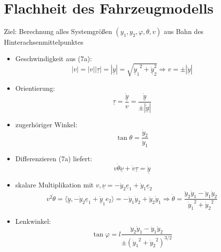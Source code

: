 \documentclass[ngerman]{tudscrreprt}
\begin{document}
\section*{Flachheit des Fahrzeugmodells}
Ziel: Berechnung alles Systemgrößen $(y_1, y_2, \varphi, \theta, v)$ aus Bahn des Hinterachsenmittelpunktes 
\begin{itemize}
\item Geschwindigkeit aus (7a): \\ 
\begin{equation*}
|v| = |v| |\underline \tau| = |\dot{\underline y}| = \sqrt{{\dot{\underline y}_1}^2 + {\dot{\underline y}}_2^2} \Rightarrow v = \pm |\dot{\underline y}|
\tag{8}
\end{equation*}
\item Orientierung: 
\begin{equation*}
\underline \tau = \frac{\dot{\underline y}}{v} = \frac{\dot{\underline y}}{\pm |\dot{\underline y}|}
\tag{9}
\end{equation*}
\item zugerhöriger Winkel:
\begin{equation*}
\tan{\theta} = \frac{\dot y_2}{\dot y_1}
\tag{10}
\end{equation*}

\item Differenzieren (7a) liefert: 
\begin{equation*}
v \dot{\theta}\underline \nu + \dot {v} \underline \tau = \ddot{\underline y}
\tag{11}
\end{equation*}
\item skalare Multiplikation mit $v, \underline \nu = - \dot{y}_2 \underline e_1 + \dot y_1 \underline e_2$ 
\begin{equation*}
v^2 \dot \theta = \langle \ddot{\underline y}, -\dot y_2 \underline e_1 + \underline{\dot{y}}_1 e_2 \rangle = -\ddot{y}_1 \dot{y}_2 + \ddot y_2 \dot y_1 \Rightarrow \dot \theta = \frac{\ddot y_2 \dot y_1 - \ddot y_1 \dot y_2}{{\dot y_1}^2 + {\dot y_2}^2}
\tag{12}
\end{equation*}
\item Lenkwinkel: 
\begin{equation*}
\tan{\varphi} = l \frac{\ddot y_2 \dot y_1 - \ddot y_1 \dot y_2}{\pm{({\dot y_1}^2 + {\dot y_2}^2)}^{3/2}}
\tag{13}
\end{equation*}
\end{itemize}
\end{document}
